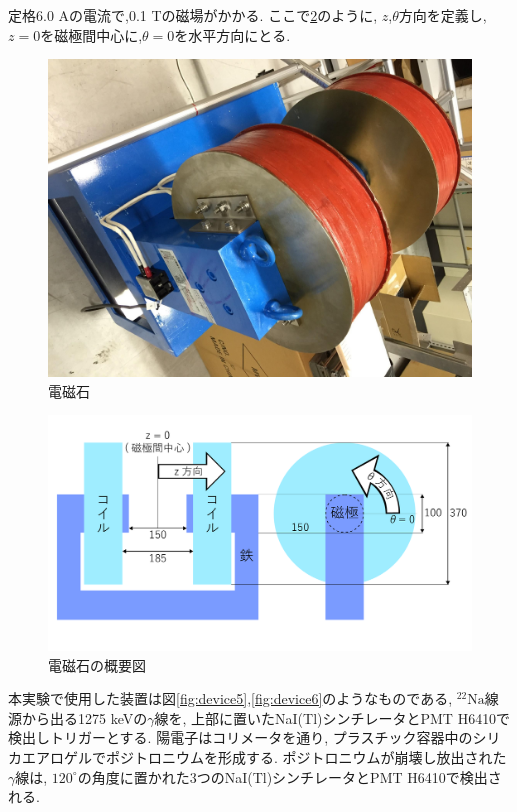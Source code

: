 定格6.0 Aの電流で,0.1 Tの磁場がかかる.
ここで\ref{fig:magnet}のように,
$z$,$\theta$方向を定義し,
$z=0$を磁極間中心に,$\theta=0$を水平方向にとる.


\begin{figure}[H]
\centering
\includegraphics[keepaspectratio,angle=90,scale=0.4]{fig/ybm/mag.pdf}
\caption{電磁石}
\label{fig:mag}
\end{figure}

\begin{figure}[H]
\centering
\includegraphics[keepaspectratio,scale=0.25]{fig/ybm/magnet.pdf}
\caption{電磁石の概要図}
\label{fig:magnet}
\end{figure}

本実験で使用した装置は図\ref{fig:device5},\ref{fig:device6}のようなものである,
$\mathrm{^{22}Na}$線源から出る1275 keVの$\gamma$線を,
上部に置いたNaI(Tl)シンチレータとPMT H6410で検出しトリガーとする.
陽電子はコリメータを通り,
プラスチック容器中のシリカエアロゲルでポジトロニウムを形成する.
ポジトロニウムが崩壊し放出された$\gamma$線は,
$120^{\circ}$の角度に置かれた3つのNaI(Tl)シンチレータとPMT H6410で検出される.

